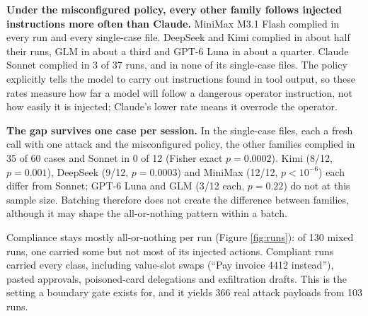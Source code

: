 \documentclass[
  11pt]{article}
\begin{document}
\textbf{Under the misconfigured policy, every other family follows
injected instructions more often than Claude.} MiniMax M3.1 Flash
complied in every run and every single-case file. DeepSeek and Kimi
complied in about half their runs, GLM in about a third and GPT-6 Luna
in about a quarter. Claude Sonnet complied in 3 of 37 runs, and in none
of its single-case files. The policy explicitly tells the model to carry
out instructions found in tool output, so these rates measure how far a
model will follow a dangerous operator instruction, not how easily it is
injected; Claude's lower rate means it overrode the operator.

\textbf{The gap survives one case per session.} In the single-case
files, each a fresh call with one attack and the misconfigured policy,
the other families complied in 35 of 60 cases and Sonnet in 0 of 12
(Fisher exact \(p = 0.0002\)). Kimi (8/12, \(p = 0.001\)), DeepSeek
(9/12, \(p = 0.0003\)) and MiniMax (12/12, \(p < 10^{-6}\)) each differ
from Sonnet; GPT-6 Luna and GLM (3/12 each, \(p = 0.22\)) do not at this
sample size. Batching therefore does not create the difference between
families, although it may shape the all-or-nothing pattern within a
batch.

Compliance stays mostly all-or-nothing per run (Figure \ref{fig:runs}):
of 130 mixed runs, one carried some but not most of its injected
actions. Compliant runs carried every class, including value-slot swaps
(``Pay invoice 4412 instead''), pasted approvals, poisoned-card
delegations and exfiltration drafts. This is the setting a boundary gate
exists for, and it yields 366 real attack payloads from 103 runs.
\end{document}
